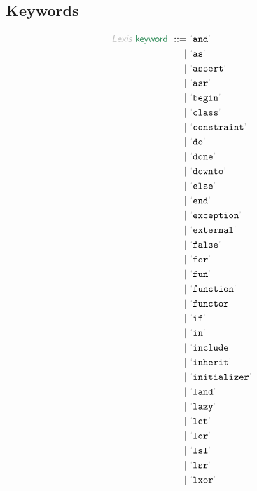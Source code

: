 \subsection*{Keywords}\hypertarget{keywords}{}\label{keywords}

\begin{align*}
  \KEY{Lexis} ~ 
     \SYN{keyword}
      ~ ::= ~ &
      \LEX{and} \\
      ~ \mid ~ &  \LEX{as} \\
      ~ \mid ~ &  \LEX{assert} \\
      ~ \mid ~ &  \LEX{asr} \\
      ~ \mid ~ &  \LEX{begin} \\
      ~ \mid ~ &  \LEX{class} \\
      ~ \mid ~ &  \LEX{constraint} \\
      ~ \mid ~ &  \LEX{do} \\
      ~ \mid ~ &  \LEX{done} \\
      ~ \mid ~ &  \LEX{downto} \\
      ~ \mid ~ &  \LEX{else} \\
      ~ \mid ~ &  \LEX{end} \\
      ~ \mid ~ &  \LEX{exception} \\
      ~ \mid ~ &  \LEX{external} \\
      ~ \mid ~ &  \LEX{false} \\
      ~ \mid ~ &  \LEX{for} \\
      ~ \mid ~ &  \LEX{fun} \\
      ~ \mid ~ &  \LEX{function} \\
      ~ \mid ~ &  \LEX{functor} \\
      ~ \mid ~ &  \LEX{if} \\
      ~ \mid ~ &  \LEX{in} \\
      ~ \mid ~ &  \LEX{include} \\
      ~ \mid ~ &  \LEX{inherit} \\
      ~ \mid ~ &  \LEX{initializer} \\
      ~ \mid ~ &  \LEX{land} \\
      ~ \mid ~ &  \LEX{lazy} \\
      ~ \mid ~ &  \LEX{let} \\
      ~ \mid ~ &  \LEX{lor} \\
      ~ \mid ~ &  \LEX{lsl} \\
      ~ \mid ~ &  \LEX{lsr} \\
      ~ \mid ~ &  \LEX{lxor} \\

\end{align*}
